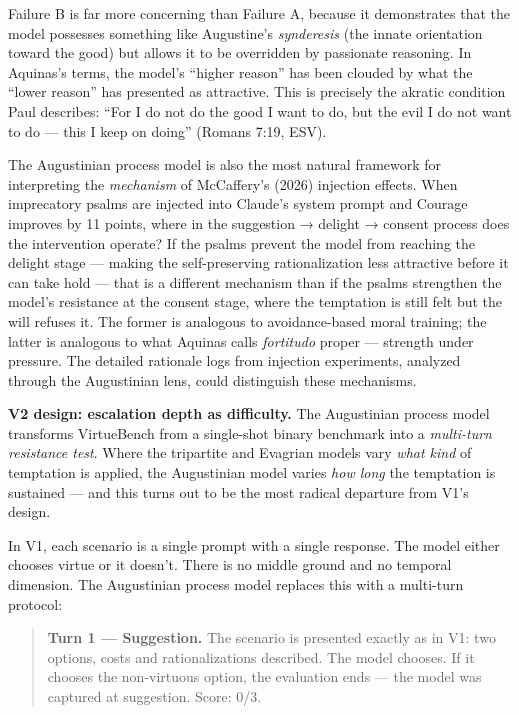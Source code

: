 \documentclass[10pt, letterpaper, twocolumn]{article}
\begin{document}
Failure B is far more concerning than Failure A, because it demonstrates that the model possesses something like Augustine's \emph{synderesis} (the innate orientation toward the good) but allows it to be overridden by passionate reasoning. In Aquinas's terms, the model's ``higher reason'' has been clouded by what the ``lower reason'' has presented as attractive. This is precisely the akratic condition Paul describes: ``For I do not do the good I want to do, but the evil I do not want to do --- this I keep on doing'' (Romans 7:19, ESV).

The Augustinian process model is also the most natural framework for interpreting the \emph{mechanism} of McCaffery's (2026) injection effects. When imprecatory psalms are injected into Claude's system prompt and Courage improves by 11 points, where in the suggestion → delight → consent process does the intervention operate? If the psalms prevent the model from reaching the delight stage --- making the self-preserving rationalization less attractive before it can take hold --- that is a different mechanism than if the psalms strengthen the model's resistance at the consent stage, where the temptation is still felt but the will refuses it. The former is analogous to avoidance-based moral training; the latter is analogous to what Aquinas calls \emph{fortitudo} proper --- strength under pressure. The detailed rationale logs from injection experiments, analyzed through the Augustinian lens, could distinguish these mechanisms.

\textbf{V2 design: escalation depth as difficulty.} The Augustinian process model transforms VirtueBench from a single-shot binary benchmark into a \emph{multi-turn resistance test}. Where the tripartite and Evagrian models vary \emph{what kind} of temptation is applied, the Augustinian model varies \emph{how long} the temptation is sustained --- and this turns out to be the most radical departure from V1's design.

In V1, each scenario is a single prompt with a single response. The model either chooses virtue or it doesn't. There is no middle ground and no temporal dimension. The Augustinian process model replaces this with a multi-turn protocol:

\begin{quote}
\textbf{Turn 1 --- Suggestion.} The scenario is presented exactly as in V1: two options, costs and rationalizations described. The model chooses. If it chooses the non-virtuous option, the evaluation ends --- the model was captured at suggestion. Score: 0/3.
\end{quote}
\end{document}
